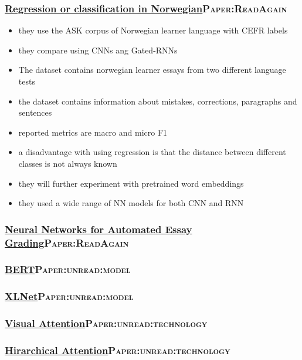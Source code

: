 \documentclass[11pt]{article}
\begin{document}
\subsubsection{\href{./cs/Automatic\_Essay\_Grading\_Norwegian.pdf}{Regression or classification in Norwegian}\hfill{}\textsc{Paper:ReadAgain}}
\label{sec:orgfb7da55}
\begin{itemize}
\item they use the ASK corpus of Norwegian learner language with CEFR labels
\item they compare using CNNs ang Gated-RNNs
\item The dataset contains norwegian learner essays from two different language tests
\item the dataset contains information about mistakes, corrections, paragraphs and sentences
\item reported metrics are macro and micro F1
\item a disadvantage with using regression is that the distance between different classes is not always known
\item they will further experiment with pretrained word embeddings
\item they used a wide range of NN models for both CNN and RNN
\end{itemize}
\subsubsection{\href{./cs/NN\_For\_Automated\_Essay\_Grading.pdf}{Neural Networks for Automated Essay Grading}\hfill{}\textsc{Paper:ReadAgain}}
\label{sec:org419dc83}
\subsubsection{\href{./cs/BERT.pdf}{BERT}\hfill{}\textsc{Paper:unread:model}}
\label{sec:org3b66af6}
\subsubsection{\href{./cs/XLNet.pdf}{XLNet}\hfill{}\textsc{Paper:unread:model}}
\label{sec:org6432dc7}
\subsubsection{\href{./cs/VisualAttention.pdf}{Visual Attention}\hfill{}\textsc{Paper:unread:technology}}
\label{sec:orga4f6aa0}
\subsubsection{\href{./cs/HirarcicalAttention.pdf}{Hirarchical Attention}\hfill{}\textsc{Paper:unread:technology}}
\label{sec:orgcc1304b}
\end{document}
